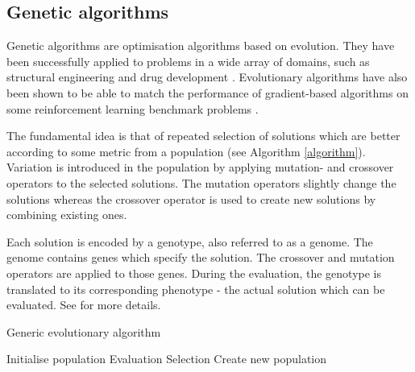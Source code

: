 \subsection{Genetic algorithms}
Genetic algorithms are optimisation algorithms based on evolution. They have been successfully
applied to problems in a wide array of domains, such as structural engineering \cite{engineering_gas}
and drug development \cite{drug_gas}. Evolutionary algorithms have also been shown to be able to match
the performance of gradient-based algorithms on some reinforcement learning benchmark problems \cite{es_reinforce}.

The fundamental idea is that of repeated selection of solutions which are better according to
some metric from a population (see Algorithm \ref{algorithm}).
Variation is introduced in the population by applying mutation- and crossover operators to the
selected solutions. The mutation operators slightly change the solutions whereas the crossover
operator is used to create new solutions by combining existing ones.

Each solution is encoded by a genotype, also referred to as a genome. The genome contains
genes which specify the solution. The crossover and mutation operators are applied to those genes.
During the evaluation, the genotype is translated to its corresponding phenotype -
the actual solution which can be evaluated. See \cite{compint} for more details.


\begin{algorithm}[H]
    \caption{Generic evolutionary algorithm}
    \begin{algorithmic}

    \State Initialise population
        \State Evaluation 
        \State Selection  
        \State Create new population 
    \EndWhile
\EndProcedure

\end{algorithmic}
\label{algorithm}
\end{algorithm}
